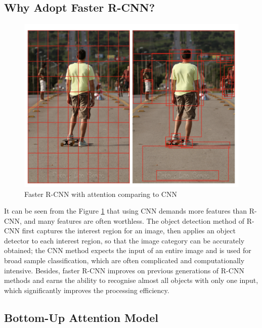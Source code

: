 
\subsection{Why Adopt Faster R-CNN?}

\begin{figure}[h!]
\centering
\includegraphics[width=.5\textwidth]{whyfasterrcnn.pdf}
\caption{Faster R-CNN with attention comparing to CNN \cite{bottomup}}
\label{fig:fasterrcnnbottomup}
\end{figure}

It can be seen from the Figure \ref{fig:fasterrcnnbottomup} that using CNN demands more features than R-CNN, and many features are often worthless. The object detection method of R-CNN first captures the interest region for an image, then applies an object detector to each interest region, so that the image category can be accurately obtained; the CNN method expects the input of an entire image and is used for broad sample classification, which are often complicated and computationally intensive. Besides, faster R-CNN improves on previous generations of R-CNN methods and earns the ability to recognise almost all objects with only one input, which significantly improves the processing efficiency.

\subsection{Bottom-Up Attention Model}

